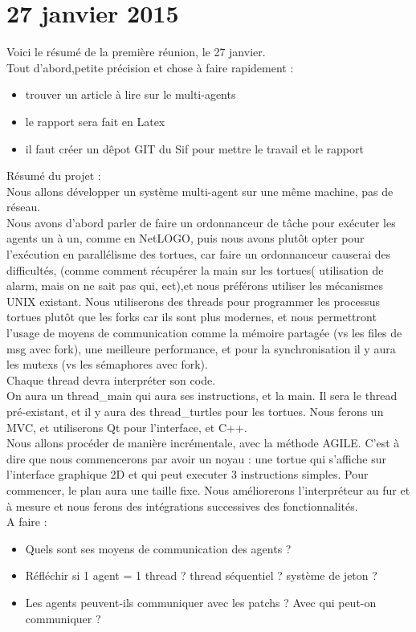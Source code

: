 \section{27 janvier 2015}

Voici le résumé de la première réunion, le 27 janvier.\\
Tout d'abord,petite précision et chose à faire rapidement :
\begin{itemize}
\item  trouver un article à lire sur le multi-agents
\item le rapport sera fait en Latex
\item il faut créer un dêpot GIT du Sif pour mettre le travail et le rapport
\end{itemize}

Résumé du projet :\\
Nous allons développer un système multi-agent sur une même machine, pas de réseau.\\
Nous avons d'abord parler de faire un ordonnanceur de tâche pour exécuter les agents un à un, comme en NetLOGO, puis nous avons plutôt opter pour l’exécution en parallélisme des tortues, car faire un ordonnanceur causerai des difficultés, (comme comment récupérer la main sur les tortues( utilisation de alarm, mais on ne sait pas qui, ect),et nous préférons utiliser les mécanismes UNIX existant.
Nous utiliserons des threads pour programmer les processus tortues plutôt que les forks car ils sont plus modernes, et nous permettront l'usage de moyens de communication comme la mémoire partagée (vs les files de msg avec fork), une meilleure performance, et pour la synchronisation il y aura les mutexs (vs les sémaphores avec fork).\\
Chaque thread devra interpréter son code.\\
On aura un thread\_main qui aura ses instructions, et la main. Il sera le thread pré-existant, et il y aura des thread\_turtles pour les tortues.
Nous ferons un MVC, et utiliserons Qt pour l'interface, et C++.\\
Nous allons procéder de manière incrémentale, avec la méthode AGILE. C'est à dire que nous commencerons par avoir un noyau : une tortue qui s'affiche sur l'interface graphique 2D et qui peut executer 3 instructions simples. Pour commencer, le plan aura une taille fixe. Nous améliorerons l'interpréteur au fur et à mesure et nous ferons des intégrations successives des fonctionnalités.\\

A faire :
\begin{itemize}
\item Quels sont ses moyens de communication des agents ? 
\item Réfléchir si 1 agent = 1 thread ? thread séquentiel ? système de jeton ? 
\item Les agents peuvent-ils communiquer avec les patchs ? Avec qui peut-on communiquer ?
\end{itemize}

